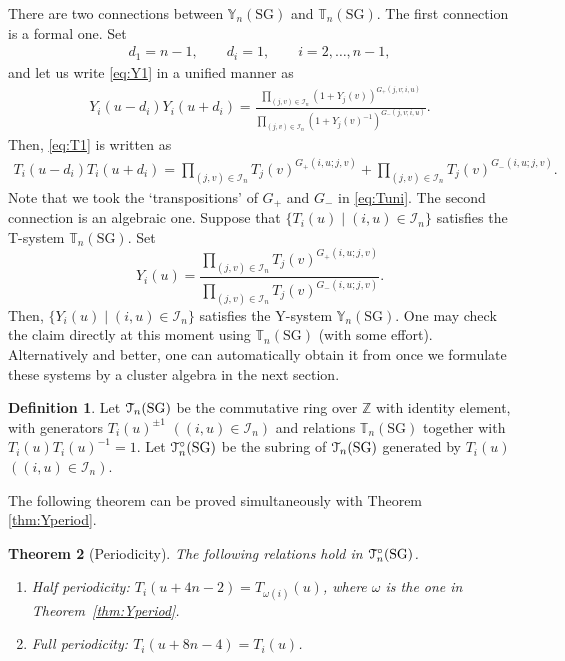 \documentclass[11pt]{article}
\numberwithin{equation}{section}
\newtheorem{Theorem}{Theorem}[section]
\theoremstyle{definition}
\newtheorem{Definition}[Theorem]{Definition}
\begin{document}
There are two connections between
$\mathbb{Y}_{n}(\mathrm{SG})$ and $\mathbb{T}_{n}(\mathrm{SG})$.
The f\/irst connection is a formal one.
Set
\begin{gather}
\label{eq:di}
d_1=n-1, \qquad d_i=1,\qquad i=2,\dots,n-1,
\end{gather}
and let us  write \eqref{eq:Y1}
in a unif\/ied manner as
\begin{gather}
\label{eq:Yuni}
Y_i\left(u-d_i\right)
Y_i\left(u+d_i\right)
=
\frac{
{\prod\limits_{(j,v)\in \mathcal{I}_{n}}
(1+Y_j(v))^{G_+(j,v;i,u)}
}
}
{\prod\limits_{(j,v)\in \mathcal{I}_{n}}
(1+Y_j(v)^{-1})^{G_-(j,v;i,u)}
}.
\end{gather}
Then, \eqref{eq:T1} is written as
\begin{gather}
\label{eq:Tuni}
T_i\left(u-d_i\right)
T_i\left(u+d_i\right)
=
\prod_{(j,v)\in \mathcal{I}_{n}}
T_j(v)^{G_+(i,u;j,v)}
+
\prod_{(j,v)\in \mathcal{I}_{n}}
T_j(v)^{G_-(i,u;j,v)}.
\end{gather}
Note that we took the `transpositions'
of $G_+$ and $G_-$ in \eqref{eq:Tuni}.
The second connection is an algebraic one.
Suppose that $\{ T_i(u) \mid (i,u)
\in \mathcal{I}_n\}$ satisf\/ies
the T-system $\mathbb{T}_n(\mathrm{SG})$.
Set
\[
Y_i(u)
=
\frac{\prod\limits_{(j,v)\in \mathcal{I}_{n}}
T_j(v)^{G_+(i,u;j,v)}
}
{\prod\limits_{(j,v)\in \mathcal{I}_{n}}
T_j(v)^{G_-(i,u;j,v)}}.
\]
Then, $\{ Y_i(u) \mid (i,u)
\in \mathcal{I}_n\}$ satisf\/ies
the Y-system $\mathbb{Y}_n(\mathrm{SG})$.
One may check the claim directly at this moment
using $\mathbb{T}_n(\mathrm{SG})$
(with some ef\/fort).
Alternatively and better, one can automatically obtain  it from
 \cite[Proposition 3.9]{Fomin07}
once we formulate these systems by a cluster algebra
in the next section.

\begin{Definition}
\label{defn:TC}
Let $\EuScript{T}_{n}(\mathrm{SG})$
be the commutative ring over $\mathbb{Z}$
with identity element,  with gene\-ra\-tors
$T_i(u)^{\pm 1}$ $((i,u)\in \mathcal{I}_{n})$
and relations $\mathbb{T}_{n}(\mathrm{SG})$
together with $T_i(u)T_i(u)^{-1}=1$.
Let $\EuScript{T}^{\circ}_{n}(\mathrm{SG})$
be the subring of $\EuScript{T}_{n}(\mathrm{SG})$
generated by
$T_i(u)$ $((i,u)\in \mathcal{I}_{n})$.
\end{Definition}

The following theorem can be proved simultaneously
with Theorem \ref{thm:Yperiod}.

\begin{Theorem}[Periodicity]
\label{thm:Tperiod}
The following relations hold in $\EuScript{T}^{\circ}_{n}(\mathrm{SG})$.
\begin{enumerate}\itemsep=0pt
\item[$(i)$] Half periodicity: $T_i(u+4n-2)=T_{\omega(i)}(u)$, where
$\omega$ is the  one in Theorem~{\rm \ref{thm:Yperiod}}.
\item[$(ii)$] Full periodicity: $T_i(u+8n-4)=T_i(u)$.
\end{enumerate}
\end{Theorem}
\end{document}
